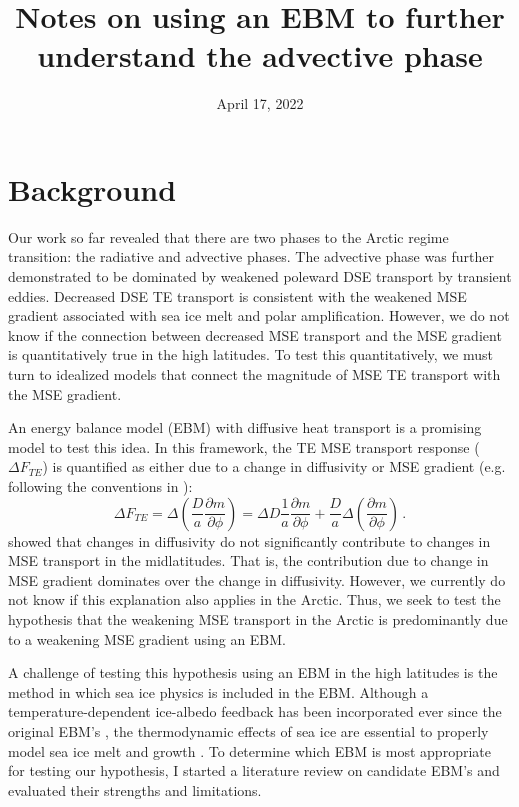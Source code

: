 \documentclass{article}
\title{Notes on using an EBM to further understand the advective phase}
\date{April 17, 2022}
\begin{document}
\maketitle

\section{Background}
Our work so far revealed that there are two phases to the Arctic regime transition: the radiative and advective phases. The advective phase was further demonstrated to be dominated by weakened poleward DSE transport by transient eddies. Decreased DSE TE transport is consistent with the weakened MSE gradient associated with sea ice melt and polar amplification. However, we do not know if the connection between decreased MSE transport and the MSE gradient is quantitatively true in the high latitudes. To test this quantitatively, we must turn to idealized models that connect the magnitude of MSE TE transport with the MSE gradient.

An energy balance model (EBM) with diffusive heat transport is a promising model to test this idea. In this framework, the TE MSE transport response ($\Delta F_{TE}$) is quantified as either due to a change in diffusivity or MSE gradient (e.g. following the conventions in \cite{mooring2020}):
\begin{equation}
    \Delta F_{TE} = \Delta \left(\frac{D}{a}\frac{\partial m}{\partial \phi}\right) = \Delta D \frac{1}{a}\frac{\partial m}{\partial \phi} + \frac{D}{a}\Delta\left(\frac{\partial m}{\partial \phi}\right) \, .
\end{equation}
\cite{mooring2020} showed that changes in diffusivity do not significantly contribute to changes in MSE transport in the midlatitudes. That is, the contribution due to change in MSE gradient dominates over the change in diffusivity. However, we currently do not know if this explanation also applies in the Arctic. Thus, we seek to test the hypothesis that the weakening MSE transport in the Arctic is predominantly due to a weakening MSE gradient using an EBM.

A challenge of testing this hypothesis using an EBM in the high latitudes is the method in which sea ice physics is included in the EBM. Although a temperature-dependent ice-albedo feedback has been incorporated ever since the original EBM's \citep[e.g.,][]{budyko1969,sellers1969}, the thermodynamic effects of sea ice are essential to properly model sea ice melt and growth \citep{eisenman2009}. To determine which EBM is most appropriate for testing our hypothesis, I started a literature review on candidate EBM's and evaluated their strengths and limitations.
\end{document}
